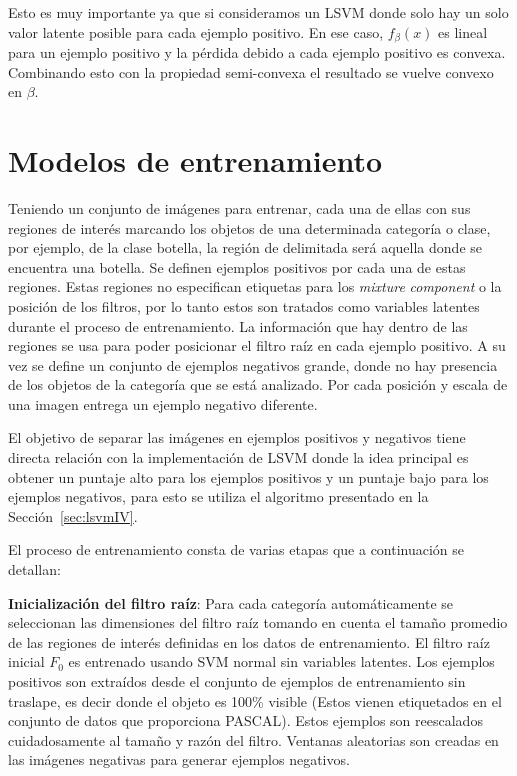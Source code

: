 Esto es muy importante ya que si consideramos un LSVM donde solo hay un solo valor latente posible para cada ejemplo positivo. En ese caso, $f_{\beta}(x)$ es lineal para un ejemplo positivo y la pérdida debido a cada ejemplo positivo es convexa. Combinando esto con la propiedad semi-convexa el resultado se vuelve convexo en $\beta$.

\section{Modelos de entrenamiento}\label{subsec:t_models}

Teniendo un conjunto de imágenes para entrenar, cada una de ellas con sus regiones de interés marcando los objetos de una determinada categoría o clase, por ejemplo, de la clase botella, la región de delimitada será aquella donde se encuentra una botella. Se definen ejemplos positivos por cada una de estas regiones. Estas regiones no especifican etiquetas para los \textit{mixture} \textit{component} o la posición de los filtros, por lo tanto estos son tratados como variables latentes durante el proceso de entrenamiento.
La información que hay dentro de las regiones se usa para poder posicionar el filtro raíz en cada ejemplo positivo. A su vez se define un conjunto de ejemplos negativos grande, donde no hay presencia de los objetos de la categoría que se está analizado.
Por cada posición y escala de una imagen entrega un ejemplo negativo diferente.

El objetivo de separar las imágenes en ejemplos positivos y negativos tiene directa relación con la implementación de LSVM donde la idea principal es obtener un puntaje alto para los ejemplos positivos y un puntaje bajo para los ejemplos negativos, para esto se utiliza el algoritmo presentado en la Sección~\ref{sec:lsvmIV}.

El proceso de entrenamiento consta de varias etapas que a continuación se detallan:

\textbf{Inicialización del filtro raíz}:
Para cada categoría automáticamente se seleccionan las dimensiones del filtro raíz tomando en cuenta el tamaño promedio de las regiones de interés definidas en los datos de entrenamiento. El filtro raíz inicial $F_0$ es entrenado usando SVM normal sin variables latentes. Los ejemplos positivos son extraídos desde el conjunto de ejemplos de entrenamiento sin traslape, es decir donde el objeto es 100\% visible (Estos vienen etiquetados en el conjunto de datos que proporciona PASCAL). Estos ejemplos son reescalados cuidadosamente al tamaño y razón del filtro. Ventanas aleatorias son creadas en las imágenes negativas para generar ejemplos negativos.

